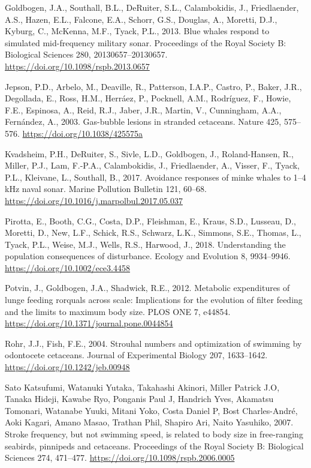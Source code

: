 \documentclass[]{elsarticle} %
\begin{document}
\hypertarget{ref-goldbogen_blue_2013}{}
Goldbogen, J.A., Southall, B.L., DeRuiter, S.L., Calambokidis, J.,
Friedlaender, A.S., Hazen, E.L., Falcone, E.A., Schorr, G.S., Douglas,
A., Moretti, D.J., Kyburg, C., McKenna, M.F., Tyack, P.L., 2013. Blue
whales respond to simulated mid-frequency military sonar. Proceedings of
the Royal Society B: Biological Sciences 280, 20130657--20130657.
\url{https://doi.org/10.1098/rspb.2013.0657}

\hypertarget{ref-jepson_gas-bubble_2003}{}
Jepson, P.D., Arbelo, M., Deaville, R., Patterson, I.A.P., Castro, P.,
Baker, J.R., Degollada, E., Ross, H.M., Herráez, P., Pocknell, A.M.,
Rodríguez, F., Howie, F.E., Espinosa, A., Reid, R.J., Jaber, J.R.,
Martin, V., Cunningham, A.A., Fernández, A., 2003. Gas-bubble lesions in
stranded cetaceans. Nature 425, 575--576.
\url{https://doi.org/10.1038/425575a}

\hypertarget{ref-kvadsheim_avoidance_2017}{}
Kvadsheim, P.H., DeRuiter, S., Sivle, L.D., Goldbogen, J.,
Roland-Hansen, R., Miller, P.J., Lam, F.-P.A., Calambokidis, J.,
Friedlaender, A., Visser, F., Tyack, P.L., Kleivane, L., Southall, B.,
2017. Avoidance responses of minke whales to 1--4 kHz naval sonar.
Marine Pollution Bulletin 121, 60--68.
\url{https://doi.org/10.1016/j.marpolbul.2017.05.037}

\hypertarget{ref-pirotta_understanding_2018}{}
Pirotta, E., Booth, C.G., Costa, D.P., Fleishman, E., Kraus, S.D.,
Lusseau, D., Moretti, D., New, L.F., Schick, R.S., Schwarz, L.K.,
Simmons, S.E., Thomas, L., Tyack, P.L., Weise, M.J., Wells, R.S.,
Harwood, J., 2018. Understanding the population consequences of
disturbance. Ecology and Evolution 8, 9934--9946.
\url{https://doi.org/10.1002/ece3.4458}

\hypertarget{ref-potvin_metabolic_2012}{}
Potvin, J., Goldbogen, J.A., Shadwick, R.E., 2012. Metabolic
expenditures of lunge feeding rorquals across scale: Implications for
the evolution of filter feeding and the limits to maximum body size.
PLOS ONE 7, e44854. \url{https://doi.org/10.1371/journal.pone.0044854}

\hypertarget{ref-rohr_strouhal_2004}{}
Rohr, J.J., Fish, F.E., 2004. Strouhal numbers and optimization of
swimming by odontocete cetaceans. Journal of Experimental Biology 207,
1633--1642. \url{https://doi.org/10.1242/jeb.00948}

\hypertarget{ref-sato_katsufumi_stroke_2007}{}
Sato Katsufumi, Watanuki Yutaka, Takahashi Akinori, Miller Patrick J.O,
Tanaka Hideji, Kawabe Ryo, Ponganis Paul J, Handrich Yves, Akamatsu
Tomonari, Watanabe Yuuki, Mitani Yoko, Costa Daniel P, Bost
Charles-André, Aoki Kagari, Amano Masao, Trathan Phil, Shapiro Ari,
Naito Yasuhiko, 2007. Stroke frequency, but not swimming speed, is
related to body size in free-ranging seabirds, pinnipeds and cetaceans.
Proceedings of the Royal Society B: Biological Sciences 274, 471--477.
\url{https://doi.org/10.1098/rspb.2006.0005}
\end{document}
